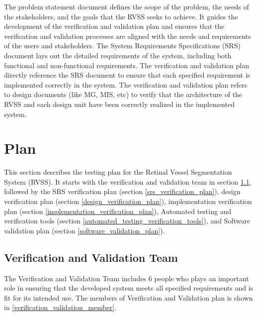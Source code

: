 \documentclass[12pt, titlepage]{article}
\begin{document}
The problem statement document defines the scope of the problem, the needs of the stakeholders, and the goals that the RVSS seeks to achieve. It guides the development of the verification and validation plan and ensures that the verification and validation processes are aligned with the needs and requirements of the users and stakeholders. The System Requirements Specifications (SRS) document lays out the detailed requirements of the system, including both functional and non-functional requirements. The verification and validation plan directly reference the SRS document to ensure that each specified requirement is implemented correctly in the system. The verification and validation plan refers to design documents (like MG, MIS, etc) to verify that the architecture of the RVSS and each design unit have been correctly realized in the implemented system. 




\section{Plan}
\label{plan}

This section describes the testing plan for the Retinal Vessel Segmentation System (RVSS). It starts with the verification and validation team in section \ref{verification_validation_team}, followed by the SRS verification plan (section \ref{srs_verification_plan}), design verification plan (section \ref{design_verification_plan}), implementation verification plan (section \ref{implementation_verification_plan}), Automated testing and verification tools (section \ref{automated_testing_verification_tools}), and Software validation plan (section \ref{software_validation_plan}).  

\subsection{Verification and Validation Team}
\label{verification_validation_team}

The Verification and Validation Team includes 6 people who plays an important role in ensuring that the developed system meets all specified requirements and is fit for its intended use. The members of Verification and Validation plan is shown in \autoref{verification_validation_member}. 
\newline
\newline
\end{document}
